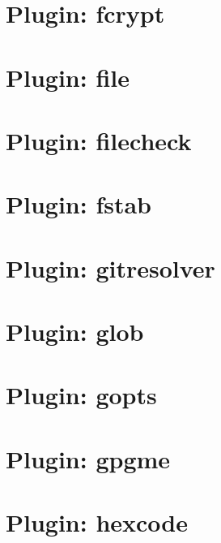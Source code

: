 \let\mypdfximage\pdfximage\def\pdfximage{\immediate\mypdfximage}\documentclass[twoside]{book}
\newcommand{\+}{\discretionary{\mbox{\scriptsize$\hookleftarrow$}}{}{}}
\begin{document}
\chapter{Plugin\+: fcrypt}
\label{md_src_plugins_fcrypt_README}

\chapter{Plugin\+: file}
\label{md_src_plugins_file_README}

\chapter{Plugin\+: filecheck}
\label{md_src_plugins_filecheck_README}

\chapter{Plugin\+: fstab}
\label{md_src_plugins_fstab_README}

\chapter{Plugin\+: gitresolver}
\label{md_src_plugins_gitresolver_README}

\chapter{Plugin\+: glob}
\label{md_src_plugins_glob_README}

\chapter{Plugin\+: gopts}
\label{md_src_plugins_gopts_README}

\chapter{Plugin\+: gpgme}
\label{md_src_plugins_gpgme_README}

\chapter{Plugin\+: hexcode}
\label{md_src_plugins_hexcode_README}

\end{document}
